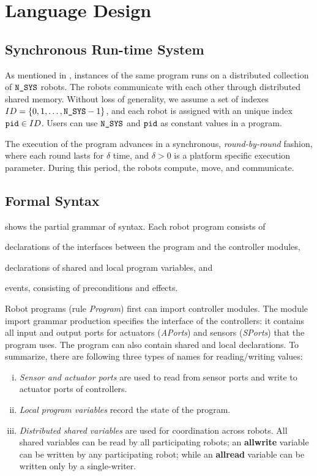 \section{\lgname Language Design}
\label{sec:language}

\subsection{Synchronous Run-time System }

As mentioned in , instances of the same \lgname program runs on a distributed collection of $\texttt{N\_SYS}$ robots.
The robots communicate with each other through distributed shared memory.
Without loss of generality, we assume a set of indexes $ID = \{0,1,\dots,\texttt{N\_SYS}-1\}$,
and each robot is assigned with an unique index $\texttt{pid} \in ID$.
Users can use $\texttt{N\_SYS}$ and $\texttt{pid}$ as constant values in a \lgname program.

The execution of the \lgname program advances in a synchronous, \emph{round-by-round} fashion, where each round lasts for $\delta$ time,
and $\delta >0$ is a platform specific execution parameter.
During this period, the robots compute, move, and communicate.


\subsection{Formal Syntax}\label{sec:syntax}

 shows the partial grammar of \lgname syntax.
Each robot program consists of
\begin{inparaenum}[(a)]
\item declarations of the interfaces between the program and the controller modules,
\item declarations of shared and local program variables, and
\item events, consisting of preconditions and effects.
\end{inparaenum}
Robot programs (rule \emph{Program}) first can import controller modules.
The module import grammar production specifies the interface of the controllers:
it contains all input and output ports for actuators (\emph{APorts}) and sensors (\emph{SPorts}) that the program uses.
The program can also contain shared and local declarations.
To summarize, there are following three types of names for reading/writing values:
\begin{enumerate}[(i)]
\item \emph{Sensor and actuator ports} are used to read from sensor ports and write to actuator ports of controllers.
\item \emph{Local program variables} record the state of the program.
\item \emph{Distributed shared variables} are used for coordination across robots. All shared variables can be read by all participating robots; an
      \textbf{allwrite} variable can be written by any participating robot; while an 
      \textbf{allread} variable can be written only by a single-writer.
\end{enumerate}

